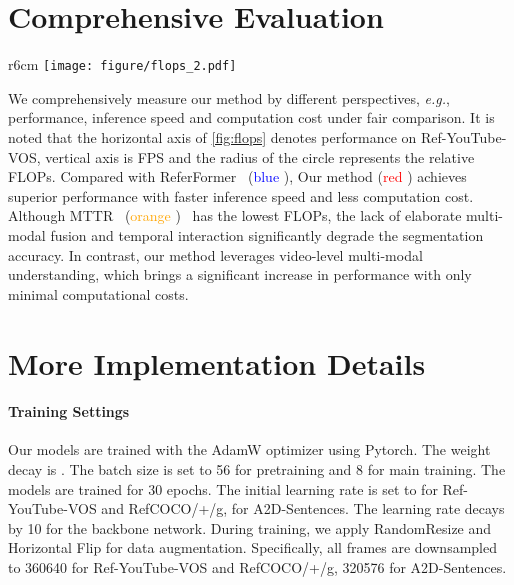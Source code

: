 \documentclass{article}
\begin{document}
\section{Comprehensive Evaluation}
\begin{wrapfigure}{r}{6cm}
\vspace{-10pt}
\centering
\texttt{[image: figure/flops\_2.pdf]}
    \vspace{-15pt}
    \caption{Performance \textit{vs} Inference Speed \textit{vs} Computation Cost.}
    \label{fig:flops}
\end{wrapfigure}
We comprehensively measure our method by different perspectives, \textit{e.g.}, performance, inference speed and computation cost under fair comparison. It is noted that the horizontal axis of \cref{fig:flops} denotes performance on Ref-YouTube-VOS, vertical axis is FPS and the radius of the circle represents the relative FLOPs. Compared with ReferFormer~\cite{referformer} (\textcolor{blue}{blue} \textcolor{blue}{}), Our method (\textcolor{red}{red} \textcolor{red}{}) achieves superior performance with faster inference speed and less computation cost. Although MTTR~\cite{mttr} (\textcolor{orange}{orange} \textcolor{orange}{})~\cite{mttr} has the lowest FLOPs, the lack of elaborate multi-modal fusion and temporal interaction significantly degrade the segmentation accuracy. In contrast, our method leverages video-level multi-modal understanding, which brings a significant increase in performance with only minimal computational costs.

\section{More Implementation Details} \label{app:b}

\paragraph{Training Settings}
Our models are trained with the AdamW optimizer using Pytorch. The weight decay is .
The batch size is set to 56 for pretraining and 8 for main training.
The models are trained for 30 epochs. The initial learning rate is set to  for Ref-YouTube-VOS and RefCOCO/+/g,  for A2D-Sentences.
The learning rate decays by 10 for the backbone network.
During training, we apply RandomResize and Horizontal Flip for data augmentation.
Specifically, all frames are downsampled to 360640 for Ref-YouTube-VOS and RefCOCO/+/g, 320576 for A2D-Sentences.
\end{document}

